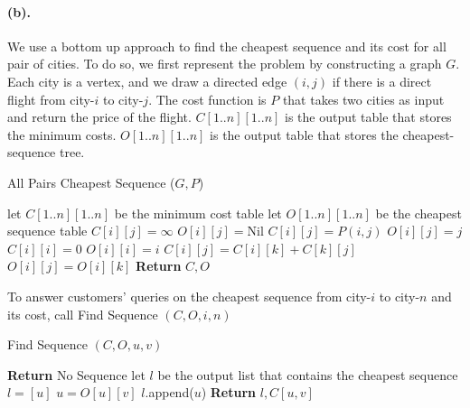 \documentclass[12pt]{article}
\begin{document}
\paragraph{(b).} We use a bottom up approach to find the cheapest sequence and its cost for all pair of cities. To do so, we first represent the problem by constructing a graph \(G\). Each city is a vertex, and we draw a directed edge \((i,j)\) if there is a direct flight from city-\(i\) to city-\(j\). The cost function is \(P\) that takes two cities as input and return the price of the flight. \(C[1..n][1..n]\) is the output table that stores the minimum costs. \(O[1..n][1..n]\) is the output table that stores the cheapest-sequence tree. 
\begin{algorithm}[H]
     \caption{All Pairs Cheapest Sequence (\(G, P\))}
     \begin{algorithmic}[1]
          \State let \(C[1..n][1..n]\) be the minimum cost table
          \State let \(O[1..n][1..n]\) be the cheapest sequence table
           
                    \State \(C[i][j] = \infty\)
                    \State \(O[i][j] = \text{Nil}\)
               \EndFor
          \EndFor
               \State \(C[i][j] = P(i,j)\)
               \State \(O[i][j] = j\)
          \EndFor
               \State \(C[i][i] = 0\)
               \State \(O[i][i] = i\)
          \EndFor
                              \State \(C[i][j] = C[i][k] + C[k][j]\)
                              \State \(O[i][j] = O[i][k]\)
                         \EndIf
                    \EndFor
               \EndFor
          \EndFor
          \State \textbf{Return} \(C, O\)
     \end{algorithmic}
\end{algorithm} 
\noindent To answer customers' queries on the cheapest sequence from city-\(i\) to city-\(n\) and its cost, call Find Sequence \((C,O,i,n)\)
\begin{algorithm}[H]
     \caption{Find Sequence \((C, O, u, v)\)}
     \begin{algorithmic}[1]
               \State \textbf{Return} No Sequence
          \EndIf
          \State let \(l\) be the output list that contains the cheapest sequence
          \State \(l = [u]\)
               \State \(u = O[u][v]\)
               \State \(l.\)append(\(u\))
          \EndWhile
          \State \textbf{Return} \(l, C[u,v]\)
     \end{algorithmic}
\end{algorithm}
\end{document}
